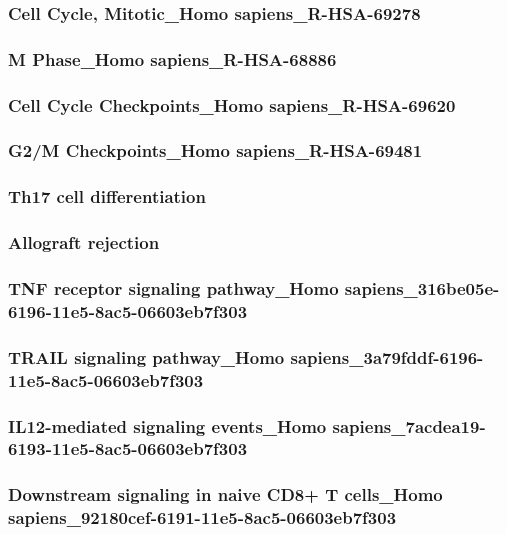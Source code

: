 \documentclass[3p,authoryear,preprint,12pt]{elsarticle}
\begin{document}
\subsubsection{Cell Cycle, Mitotic\_Homo sapiens\_R-HSA-69278}

\subsubsection{M Phase\_Homo sapiens\_R-HSA-68886}

\subsubsection{Cell Cycle Checkpoints\_Homo sapiens\_R-HSA-69620}

\subsubsection{G2/M Checkpoints\_Homo sapiens\_R-HSA-69481}

\subsubsection{Th17 cell differentiation}

\subsubsection{Allograft rejection}

\subsubsection{TNF receptor signaling pathway\_Homo sapiens\_316be05e-6196-11e5-8ac5-06603eb7f303}

\subsubsection{TRAIL signaling pathway\_Homo sapiens\_3a79fddf-6196-11e5-8ac5-06603eb7f303}

\subsubsection{IL12-mediated signaling events\_Homo sapiens\_7acdea19-6193-11e5-8ac5-06603eb7f303}

\subsubsection{Downstream signaling in naive CD8+ T cells\_Homo sapiens\_92180cef-6191-11e5-8ac5-06603eb7f303}
\end{document}
